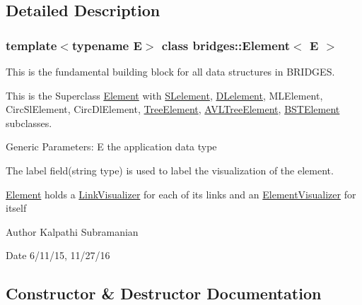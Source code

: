 \subsection{Detailed Description}
\subsubsection*{template$<$typename E$>$\newline
class bridges\+::\+Element$<$ E $>$}

This is the fundamental building block for all data structures in B\+R\+I\+D\+G\+ES. 

This is the Superclass \mbox{\hyperlink{classbridges_1_1_element}{Element}} with \mbox{\hyperlink{classbridges_1_1_s_lelement}{S\+Lelement}}, \mbox{\hyperlink{classbridges_1_1_d_lelement}{D\+Lelement}}, M\+L\+Element, Circ\+Sl\+Element, Circ\+Dl\+Element, \mbox{\hyperlink{classbridges_1_1_tree_element}{Tree\+Element}}, \mbox{\hyperlink{classbridges_1_1_a_v_l_tree_element}{A\+V\+L\+Tree\+Element}}, \mbox{\hyperlink{classbridges_1_1_b_s_t_element}{B\+S\+T\+Element}} subclasses.

Generic Parameters\+: E the application data type

The label field(string type) is used to label the visualization of the element.

\mbox{\hyperlink{classbridges_1_1_element}{Element}} holds a \mbox{\hyperlink{classbridges_1_1_link_visualizer}{Link\+Visualizer}} for each of its links and an \mbox{\hyperlink{classbridges_1_1_element_visualizer}{Element\+Visualizer}} for itself

\begin{DoxyAuthor}{Author}
Kalpathi Subramanian
\end{DoxyAuthor}
\begin{DoxyDate}{Date}
6/11/15, 11/27/16 
\end{DoxyDate}


\subsection{Constructor \& Destructor Documentation}
\mbox{\label{classbridges_1_1_element_abc7131584142ea48faf3b7a8033d1fef}} 
